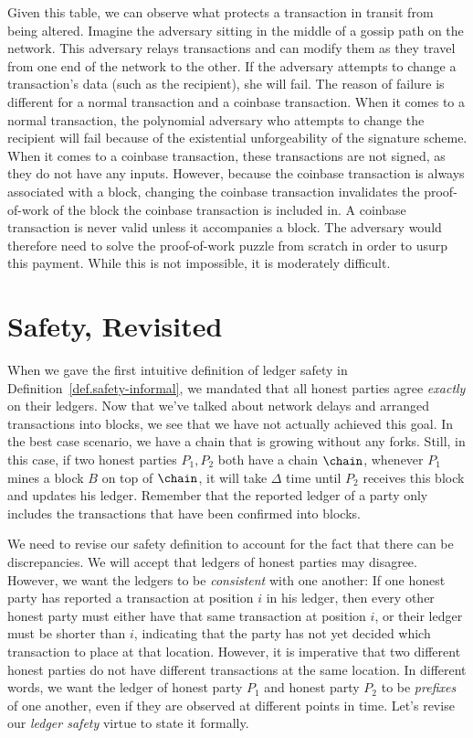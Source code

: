 Given this table, we can observe what protects a transaction in transit from being
altered. Imagine the adversary sitting in the middle of a gossip path on the network.
This adversary relays transactions and can modify them as they travel from one
end of the network to the other. If the adversary attempts to change a transaction's
data (such as the recipient), she will fail. The reason of failure is different for a
normal transaction and a coinbase transaction. When it comes to a normal transaction,
the polynomial adversary who attempts to change the recipient will fail because of the existential
unforgeability of the signature scheme. When it comes to a coinbase transaction,
these transactions are not signed, as they do not have any inputs. However, because
the coinbase transaction is always associated with a block, changing the coinbase
transaction invalidates the proof-of-work of the block the coinbase transaction is
included in. A coinbase transaction is never valid unless it accompanies a block.
The adversary would therefore need to solve the proof-of-work puzzle from scratch
in order to usurp this payment. While this is not impossible, it is moderately
difficult.

\section{Safety, Revisited}

When we gave the first intuitive definition of ledger safety in Definition~\ref{def.safety-informal}, we mandated that all honest parties
agree \emph{exactly} on their ledgers. Now that we've talked about network delays and arranged transactions into blocks, we see
that we have not actually achieved this goal. In the best case scenario, we have a chain that is growing without any forks. Still, in this
case, if two honest parties $P_1, P_2$ both have a chain $\chain$, whenever $P_1$ mines a block $B$ on top of $\chain$, it will take
$\Delta$ time until $P_2$ receives this block and updates his ledger. Remember that the reported ledger of a party only includes the
transactions that have been confirmed into blocks.

We need to revise our safety definition to account for the fact that there can be discrepancies. We will accept that ledgers of honest
parties may disagree. However, we want the ledgers to be \emph{consistent} with one another: If one honest party has reported a transaction
at position $i$ in his ledger, then every other honest party must either have that same transaction at position $i$, or their ledger
must be shorter than $i$, indicating that the party has not yet decided which transaction to place at that location. However, it is imperative
that two different honest parties do not have different transactions at the same location. In different words, we want the ledger of
honest party $P_1$ and honest party $P_2$ to be \emph{prefixes} of one another, even if they are observed at different points in time.
Let's revise our \emph{ledger safety} virtue to state it formally.

